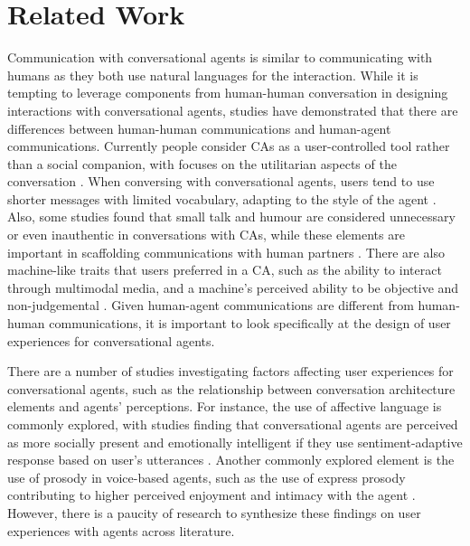 
\section{Related Work}

Communication with conversational agents is similar to communicating with humans as they both use natural languages for the interaction. While it is tempting to leverage components from human-human conversation in designing interactions with conversational agents, studies have demonstrated that there are differences between human-human communications and human-agent communications. Currently people consider CAs as a user-controlled tool rather than a social companion, with focuses on the utilitarian aspects of the conversation \cite{clark2019makes}\cmt{[1]}. When conversing with conversational agents, users tend to use shorter messages with limited vocabulary, adapting to the style of the agent \cite{hill2015real}. Also, some studies found that small talk and humour are considered unnecessary or even inauthentic in conversations with CAs, while these elements are important in scaffolding communications with human partners \cite{clark2019makes, doyle2019mapping}\cmt{[1],[2]}. There are also machine-like traits that users preferred in a CA, such as the ability to interact through multimodal media, and a machine's perceived ability to be objective and non-judgemental \cite{doyle2019mapping, kim2022understanding}\cmt{[2],[3]}. Given human-agent communications are different from human-human communications, it is important to look specifically at the design of user experiences for conversational agents.

There are a number of studies investigating factors affecting user experiences for conversational agents, such as the relationship between conversation architecture elements and agents' perceptions. For instance, the use of affective language is commonly explored, with studies finding that conversational agents are perceived as more socially present and emotionally intelligent if they use sentiment-adaptive response based on user's utterances \cite{diederich2019emulating, yang2017perceived}. Another commonly explored element is the use of prosody in voice-based agents, such as the use of express prosody contributing to higher perceived enjoyment and intimacy with the agent \cite{kim2020can}. However, there is a paucity of research to synthesize these findings on user experiences with agents across literature. 

